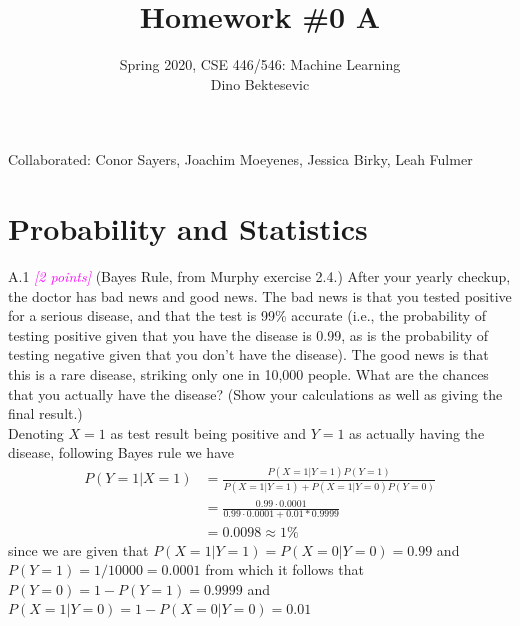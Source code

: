 \documentclass{article}
\date{{}}
\newcommand{\1}{\mathbf{1}}
\newcommand{\points}[1]{\small\textcolor{magenta}{\emph{[#1 points]}} \normalsize}
\begin{document}
\title{Homework \#0 A}
\author{\normalsize{Spring 2020, CSE 446/546: Machine Learning}\\
\normalsize{Dino Bektesevic}}
\maketitle

Collaborated: Conor Sayers, Joachim Moeyenes, Jessica Birky, Leah Fulmer

\section*{Probability and Statistics}
A.1 \points{2} (Bayes Rule, from Murphy exercise 2.4.) After your yearly checkup, the doctor has bad news and good news. The bad news is that you tested positive for a serious disease, and that the test is 99\% accurate (i.e., the probability of testing positive given that you have the disease is 0.99, as is the probability of testing negative given that you don't have the disease). The good news is that this is a rare disease, striking only one in 10,000 people. What are the chances that you actually have the disease? (Show your calculations as well as giving the final result.)\\

Denoting $X=1$ as test result being positive and $Y=1$ as actually having the disease, following Bayes rule we have
\begin{align*}
    P(Y=1|X=1) &= \frac{P(X=1|Y=1)P(Y=1)}{P(X=1|Y=1)+P(X=1|Y=0)P(Y=0)} \\
    &= \frac{0.99\cdot0.0001}{0.99\cdot0.0001 + 0.01*0.9999} \\
    &= 0.0098 \approx 1\%
\end{align*}
since we are given that $P(X=1|Y=1)=P(X=0|Y=0)=0.99$ and $P(Y=1)=1/10000=0.0001$ from which it follows that $P(Y=0)=1-P(Y=1)=0.9999$ and $P(X=1|Y=0)=1-P(X=0|Y=0)=0.01$
\end{document}
